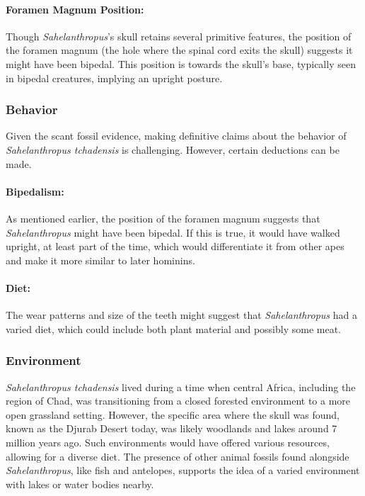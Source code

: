 \paragraph{Foramen Magnum Position:} Though \textit{Sahelanthropus}'s skull retains several primitive features, the position of the foramen magnum (the hole where the spinal cord exits the skull) suggests it might have been bipedal. This position is towards the skull's base, typically seen in bipedal creatures, implying an upright posture.

\subsubsection*{Behavior}
Given the scant fossil evidence, making definitive claims about the behavior of \textit{Sahelanthropus tchadensis} is challenging. However, certain deductions can be made.

\paragraph{Bipedalism:} As mentioned earlier, the position of the foramen magnum suggests that \textit{Sahelanthropus} might have been bipedal. If this is true, it would have walked upright, at least part of the time, which would differentiate it from other apes and make it more similar to later hominins.

\paragraph{Diet:} The wear patterns and size of the teeth might suggest that \textit{Sahelanthropus} had a varied diet, which could include both plant material and possibly some meat.

\subsubsection*{Environment}
\textit{Sahelanthropus tchadensis} lived during a time when central Africa, including the region of Chad, was transitioning from a closed forested environment to a more open grassland setting. However, the specific area where the skull was found, known as the Djurab Desert today, was likely woodlands and lakes around 7 million years ago. Such environments would have offered various resources, allowing for a diverse diet. The presence of other animal fossils found alongside \textit{Sahelanthropus}, like fish and antelopes, supports the idea of a varied environment with lakes or water bodies nearby.

